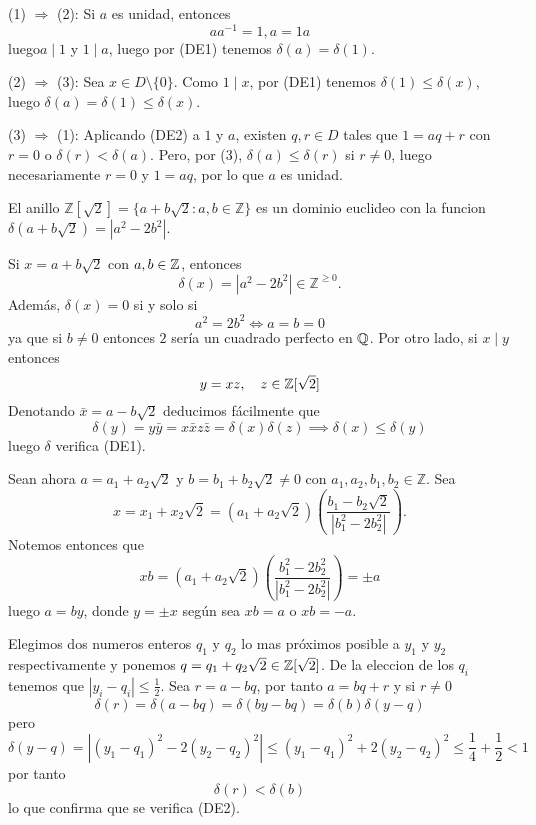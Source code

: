 \begin{proofbox}
(1) \(\Rightarrow\) (2): Si \(a\) es unidad, entonces
\[
a a^{-1} = 1, a = 1a
\]
luego\(a \mid 1\) y \(1 \mid a\), luego por (DE1) tenemos \(\delta(a) = \delta(1)\).

(2) \(\Rightarrow\) (3): Sea \(x \in D \setminus \{0\}\). Como \(1 \mid x\), por (DE1) tenemos \(\delta(1) \leq \delta(x)\), luego \(\delta(a) = \delta(1) \leq \delta(x)\).

(3) \(\Rightarrow\) (1): Aplicando (DE2) a \(1\) y \(a\), existen \(q, r \in D\) tales que \(1 = aq + r\) con \(r = 0\) o \(\delta(r) < \delta(a)\). Pero, por (3), \(\delta(a) \leq \delta(r)\) si \(r \neq 0\), luego necesariamente \(r = 0\) y \(1 = aq\), por lo que \(a\) es unidad.
\end{proofbox}

\begin{example}{}{}
El anillo \(\mathbb{Z}[\sqrt{2}] = \{a + b\sqrt{2} : a, b \in \mathbb{Z}\}\) es un dominio euclideo con la funcion \(\delta(a + b\sqrt{2}) = |a^2 - 2b^2|\).
\end{example}

\begin{proofbox}
Si \(x = a + b \sqrt{2}\) con \(a,b \in \mathbb{Z}\), entonces
\[
\delta(x) = |a^2 - 2b^2| \in \mathbb{Z}^{\geq 0}.
\]
Además, \(\delta(x) = 0\) si y solo si
\[
a^2 = 2b^2 \iff a = b = 0
\]
ya que si $b \neq 0$ entonces $2$ sería un cuadrado perfecto en $\mathbb{Q}$. Por otro lado, si $x \mid y$ entonces
\[
y = xz,\quad z \in \mathbb{Z}[\sqrt{2}]
\]
Denotando $\bar{x} = a - b\sqrt{2}$ deducimos fácilmente que
\[
\delta(y) = y\bar{y} = x\bar{x}z\bar{z} = \delta(x)\delta(z) \implies \delta(x) \leq \delta(y)
\]
luego \(\delta\) verifica (DE1).

Sean ahora \(a = a_1 + a_2\sqrt{2}\) y \(b = b_1 + b_2\sqrt{2} \neq 0\) con \(a_1, a_2, b_1, b_2 \in \mathbb{Z}\). Sea
\[
x = x_1 + x_2\sqrt{2} = (a_1 + a_2\sqrt{2})\left(\frac{b_1 - b_2\sqrt{2}}{|b_1^2 - 2b_2 ^2|}\right).
\]
Notemos entonces que
\[
xb = (a_1 + a_2\sqrt{2})\left(\frac{b_1^2 - 2b_2^2}{|b_1^2 - 2b_2 ^2|}\right) = \pm a
\]
luego $a = by$, donde $y = \pm x$ según sea $xb = a$ o $xb = -a$.

Elegimos dos numeros enteros \(q_1\) y \(q_2\) lo mas próximos posible a \(y_1\) y \(y_2\) respectivamente y ponemos \(q = q_1 + q_2\sqrt{2} \in \mathbb{Z}[\sqrt{2}]\). De la eleccion de los \(q_i\) tenemos que \(|y_i - q_i| \leq \frac{1}{2}\). Sea \(r = a - bq\), por tanto \(a = bq + r\) y si $r \neq 0$
\[
\delta(r) = \delta(a - bq) = \delta(by - bq) = \delta(b)\delta(y - q)
\]
pero
\[
\delta(y - q) = |(y_1 - q_1)^2 - 2(y_2 - q_2)^2| \leq (y_1 - q_1)^2 + 2(y_2 - q_2)^2 \leq \frac{1}{4} + \frac{1}{2} < 1
\]
por tanto
\[
\delta(r) < \delta(b)
\]
lo que confirma que se verifica (DE2).
\end{proofbox}

